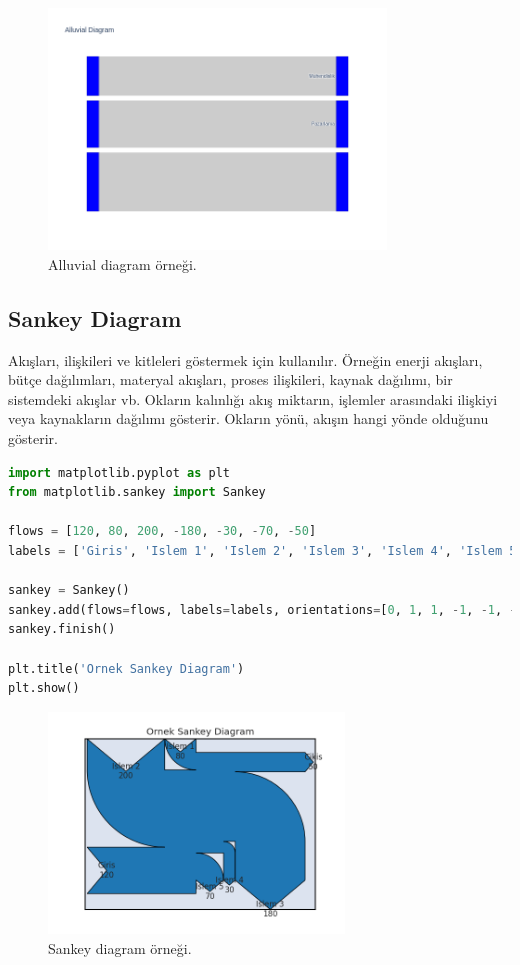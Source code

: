\begin{figure}[h]
    \centering
    \includegraphics[width=0.8\textwidth]{images/alluvial_diagram.png}
    \caption{Alluvial diagram örneği.}
    \label{fig:enter-label}
\end{figure}

\newpage

\subsection{Sankey Diagram}
Akışları, ilişkileri ve kitleleri göstermek için kullanılır. Örneğin enerji akışları, bütçe dağılımları, materyal akışları, proses ilişkileri, kaynak dağılımı, bir sistemdeki akışlar vb. Okların kalınlığı akış miktarın, işlemler arasındaki ilişkiyi veya kaynakların dağılımı gösterir. Okların yönü, akışın hangi yönde olduğunu gösterir.

\begin{lstlisting}[language=Python]
import matplotlib.pyplot as plt
from matplotlib.sankey import Sankey

flows = [120, 80, 200, -180, -30, -70, -50]
labels = ['Giris', 'Islem 1', 'Islem 2', 'Islem 3', 'Islem 4', 'Islem 5', 'Cikis']

sankey = Sankey()
sankey.add(flows=flows, labels=labels, orientations=[0, 1, 1, -1, -1, -1, 0])
sankey.finish()

plt.title('Ornek Sankey Diagram')
plt.show()
\end{lstlisting}

\begin{figure}[h]
    \centering
    \includegraphics[width=0.7\textwidth]{images/sankey_diagram.png}
    \caption{Sankey diagram örneği.}
    \label{fig:enter-label}
\end{figure}

